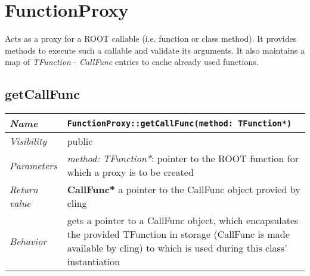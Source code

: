 \chapter{FunctionProxy}
	Acts as a proxy for a ROOT callable (i.e. function or class method). It provides methods to execute such a callable and validate its arguments. It also maintains a map of \textit{TFunction} - \textit{CallFunc} entries to cache already used functions.

\section{getCallFunc}
\begin{longtable}{p{3cm} @{\hskip 1cm} p{12cm}}
	\hline

	\textit{Name} & \texttt{FunctionProxy::getCallFunc(method: TFunction*)}\\
	\hline

	\textit{Visibility} & public\\
	\hline

	\textit{Parameters} &  \textit{method: TFunction*}: pointer to the ROOT function for which a proxy 
							is to be created\\
	\hline

	\textit{Return value} & \textbf{CallFunc*} a pointer to the CallFunc object provied by cling\\
	\hline

	\textit{Behavior} & gets a pointer to a CallFunc object, which encapsulates the provided TFunction 
			in storage (CallFunc is made available by cling)  to which is used during this class' instantiation\\
	\hline

\end{longtable} \pagebreak

